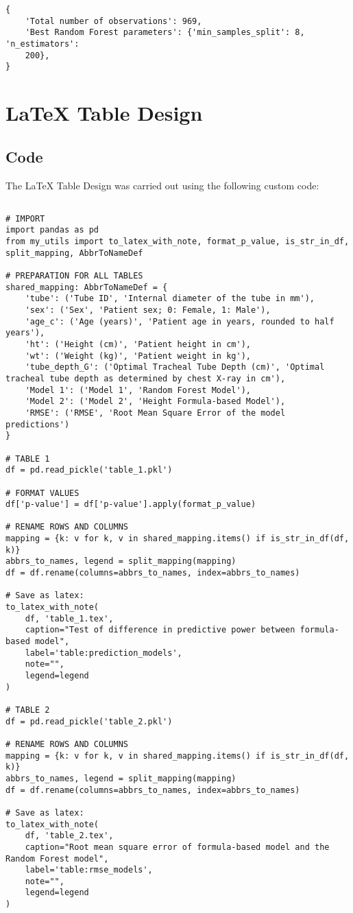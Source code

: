 \documentclass[11pt]{article}
\begin{document}
\begin{Verbatim}[tabsize=4]
{
    'Total number of observations': 969,
    'Best Random Forest parameters': {'min_samples_split': 8, 'n_estimators':
	200},
}
\end{Verbatim}

\section{LaTeX Table Design}
\subsection{{Code}}
The LaTeX Table Design was carried out using the following custom code:

\begin{verbatim}

# IMPORT
import pandas as pd
from my_utils import to_latex_with_note, format_p_value, is_str_in_df, split_mapping, AbbrToNameDef

# PREPARATION FOR ALL TABLES
shared_mapping: AbbrToNameDef = {
    'tube': ('Tube ID', 'Internal diameter of the tube in mm'),
    'sex': ('Sex', 'Patient sex; 0: Female, 1: Male'),
    'age_c': ('Age (years)', 'Patient age in years, rounded to half years'),
    'ht': ('Height (cm)', 'Patient height in cm'),
    'wt': ('Weight (kg)', 'Patient weight in kg'),
    'tube_depth_G': ('Optimal Tracheal Tube Depth (cm)', 'Optimal tracheal tube depth as determined by chest X-ray in cm'),
    'Model 1': ('Model 1', 'Random Forest Model'),
    'Model 2': ('Model 2', 'Height Formula-based Model'),
    'RMSE': ('RMSE', 'Root Mean Square Error of the model predictions')
}

# TABLE 1
df = pd.read_pickle('table_1.pkl')

# FORMAT VALUES
df['p-value'] = df['p-value'].apply(format_p_value)

# RENAME ROWS AND COLUMNS
mapping = {k: v for k, v in shared_mapping.items() if is_str_in_df(df, k)}
abbrs_to_names, legend = split_mapping(mapping)
df = df.rename(columns=abbrs_to_names, index=abbrs_to_names)

# Save as latex:
to_latex_with_note(
    df, 'table_1.tex',
    caption="Test of difference in predictive power between formula-based model",
    label='table:prediction_models',
    note="",
    legend=legend
)

# TABLE 2
df = pd.read_pickle('table_2.pkl')

# RENAME ROWS AND COLUMNS
mapping = {k: v for k, v in shared_mapping.items() if is_str_in_df(df, k)}
abbrs_to_names, legend = split_mapping(mapping)
df = df.rename(columns=abbrs_to_names, index=abbrs_to_names)

# Save as latex:
to_latex_with_note(
    df, 'table_2.tex',
    caption="Root mean square error of formula-based model and the Random Forest model",
    label='table:rmse_models',
    note="",
    legend=legend
)

\end{verbatim}
\end{document}
